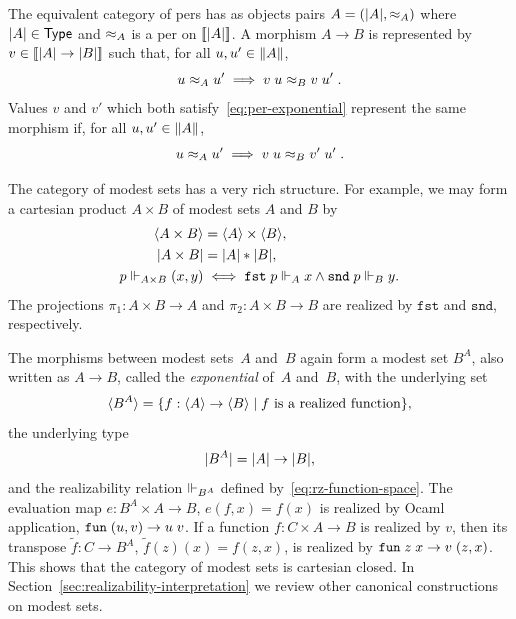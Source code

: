 The equivalent category of pers has as objects pairs $A = (|A|,
{\approx_A})$ where $|A| \in \mathsf{Type}$ and $\approx_A$ is a per on
$[\![|A|]\!]$. A morphism $A \to B$ is represented by $v
\in [\![|A| \to |B|]\!]$ such that, for all $u, u'
\in \|A\|$,
%
\begin{equation}
  \label{eq:per-exponential}
  u \approx_A u' \implies v\;u \approx_B v\;u' \;.
\end{equation}
%
Values $v$ and $v'$ which both satisfy~\eqref{eq:per-exponential}
represent the same morphism if, for all $u, u' \in \|A\|$,
%
\begin{equation*}
  u \approx_A u' \implies v\;u \approx_B v'\;u' \;.
\end{equation*}

The category of modest sets has a very rich structure. For example, we
may form a cartesian product $A \times B$ of modest sets $A$ and $B$
by
%
\begin{align*}
  \langle A \times B \rangle &= \langle A \rangle \times \langle B \rangle,\\
  |A \times B| &= |A| * |B|,\\
  p \Vdash_{A \times B} (x,y) &\iff
  \mathtt{fst}\;p \Vdash_A x \land \mathtt{snd}\;p \Vdash_B y.
\end{align*}
%
The projections $\pi_1 : A \times B \to A$ and $\pi_2 : A \times B \to
B$ are realized by $\mathtt{fst}$ and $\mathtt{snd}$, respectively.

The morphisms between modest sets~$A$ and~$B$ again form a modest set
$B^A$, also written as $A \to B$, called the \emph{exponential} of~$A$
and~$B$, with the underlying set
%
\begin{equation*}
  \langle B^A \rangle =
  \{f : \langle A \rangle \to \langle B \rangle \mid \text{$f$ is a realized function}\},
\end{equation*}
%
the underlying type
%
\begin{equation*}
  |B^A| = |A| \to |B|,
\end{equation*}
%
and the realizability relation $\Vdash_{B^A}$ defined
by~\eqref{eq:rz-function-space}. The evaluation map $e : B^A \times A
\to B$, $e(f,x) = f(x)$ is realized by Ocaml application,
$\mathtt{fun}\;(u,v) \to u\;v$. If a function $f : C \times A \to B$ is realized
by $v$, then its transpose $\tilde{f} : C \to B^A$, $\tilde{f}(z)(x) =
f(z,x)$, is realized by $\mathtt{fun}\;z\;x \to v \; (z,x)$. This shows that the
category of modest sets is cartesian closed. In
Section~\ref{sec:realizability-interpretation} we review other
canonical constructions on modest sets.

